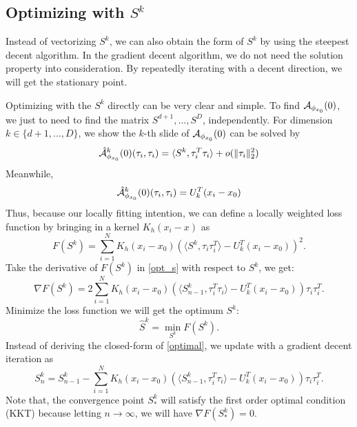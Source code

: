 \documentclass[aos,preprint]{imsart}
\theoremstyle{remark}
\newtheorem{example}{Example}
\begin{document}
\begin{appendix}
\subsection{Optimizing with $S^k$ }
Instead of vectorizing $S^k$, we can also obtain the form of $S^k$ by using the steepest decent algorithm. In the gradient decent algorithm, we do not need the solution property into consideration. By repeatedly iterating with a decent direction, we will get the stationary point.


Optimizing with the $S^k$ directly can be very clear and simple. To find ${\cal A}_{\phi_{x_0}}(0)$, we just to need to find the matrix $S^{d+1},...,S^{D}$, independently.
For dimension $k\in \{d+1,...,D\}$, we show the $k$-th slide of ${\cal A}_{\phi_{x_0}}(0)$ can be solved by
\[
\hat{\cal A}_{\phi_{x_0}}^{k}(0)(\tau_i,\tau_i) = \langle S^k, \tau_i^T \tau_i \rangle + o(\|\tau_i\|_2^2)
\]
Meanwhile,
\[
 \hat{\cal A}_{\phi_{x_0}}^{k}(0)(\tau_i,\tau_i) = U_k^T (x_i -x_0)
\]
Thus, because our locally fitting intention, we can define a locally weighted loss function by bringing in a kernel $K_h(x_i-x)$ as
\begin{equation}\label{opt_s}
F(S^k) = \sum_{i=1}^N K_h(x_i-x_0) (\langle S^k, \tau_i\tau_i^T\rangle-U_k^T(x_i-x_0))^2.
\end{equation}
Take the derivative of $F(S^k)$ in \eqref{opt_s} with respect to $S^k$, we get:
\[
\nabla F(S^k) =  2\sum_{i=1}^N K_h(x_i-x_0)(\langle S_{n-1}^k, \tau_i^T\tau_i\rangle-U_k^T(x_i-x_0)) \tau_i \tau_i^T.
\]
Minimize the loss function we will get the optimum $S^k$:
\begin{equation}\label{optimal}
\hat{S}^k = \min_{S^k} F(S^k).
\end{equation}
Instead of deriving the closed-form of \eqref{optimal}, we update with a gradient decent iteration as
\[
S_n^k = S_{n-1}^k -  \sum_{i=1}^N K_h(x_i-x_0)(\langle S_{n-1}^k, \tau_i^T\tau_i\rangle-U_k^T(x_i-x_0)) \tau_i \tau_i^T.
\]
Note that, the convergence point $S^k_*$ will satisfy the first order optimal condition (KKT) because letting $n\rightarrow \infty$, we will have $\nabla F(S^k_*)=0$.


\end{appendix}
\end{document}
